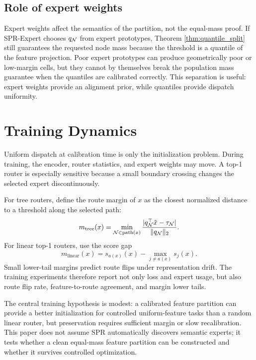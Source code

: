 \documentclass{article}
\begin{document}
\subsection{Role of expert weights}

Expert weights affect the semantics of the partition, not the equal-mass proof.
If SPR-Expert chooses $q_{\mathcal{N}}$ from expert prototypes, Theorem
\ref{thm:quantile_split} still guarantees the requested node mass because the
threshold is a quantile of the feature projection.  Poor expert prototypes can
produce geometrically poor or low-margin cells, but they cannot by themselves
break the population mass guarantee when the quantiles are calibrated correctly.
This separation is useful: expert weights provide an alignment prior, while
quantiles provide dispatch uniformity.

\section{Training Dynamics}

Uniform dispatch at calibration time is only the initialization problem.  During
training, the encoder, router statistics, and expert weights may move.  A top-1
router is especially sensitive because a small boundary crossing changes the
selected expert discontinuously.

For tree routers, define the route margin of $x$ as the closest normalized
distance to a threshold along the selected path:
\begin{equation}
 m_{\mathrm{tree}}(x)=\min_{\mathcal{N}\in\mathrm{path}(x)}
 \frac{|q_{\mathcal{N}}^{\top}\tilde x-\tau_{\mathcal{N}}|}{\|q_{\mathcal{N}}\|_2}.
\end{equation}
For linear top-1 routers, use the score gap
\begin{equation}
 m_{\mathrm{linear}}(x)=s_{a(x)}(x)-\max_{j\ne a(x)}s_j(x).
\end{equation}
Small lower-tail margins predict route flips under representation drift.  The
training experiments therefore report not only loss and expert usage, but also
route flip rate, feature-to-route agreement, and margin lower tails.

The central training hypothesis is modest: a calibrated feature partition can
provide a better initialization for controlled uniform-feature tasks than a
random linear router, but preservation requires sufficient margin or slow
recalibration.  This paper does not assume SPR automatically discovers semantic
experts; it tests whether a clean equal-mass feature partition can be constructed
and whether it survives controlled optimization.
\end{document}
